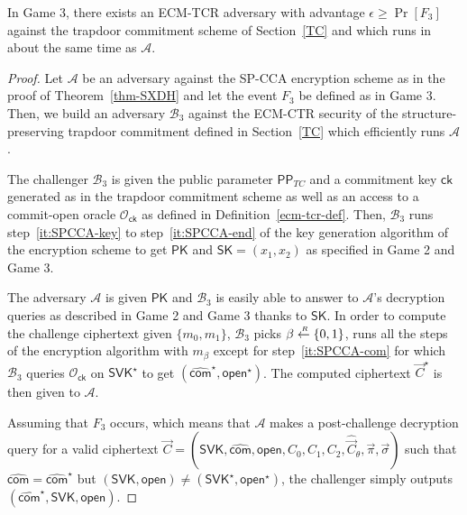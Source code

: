 \documentclass[10pt]{llncs}
\newcommand{\Adv}{\mathbf{Adv}}
\newcommand{\A}{\mathcal{A}}
\newcommand{\B}{\mathcal{B}}
\newcommand{\SK}{\mathsf{SK}}
\newcommand{\PK}{\mathsf{PK}}
\newcommand{\SVK}{\mathsf{SVK}}
\newcommand{\ck}{\mathsf{ck}}
\newcommand{\com}{\hat{\mathsf{com}}}
\newcommand{\open}{\mathsf{open}}
\newcommand{\sample}{\stackrel{{\scriptscriptstyle \mkern4mu R}}{\gets}}
\newcommand{\PPP}{\mathsf{PP}}
\begin{document}
\begin{lemma}\label{lemma-game3}
  In Game 3, %
	there exists an ECM-TCR adversary with  advantage $\epsilon \geq \Pr[F_3]$ against  the  trapdoor commitment scheme of Section~\ref{TC} and which 
	runs in about the same time as $\A$.
\end{lemma}
\begin{proof}
  Let $\A$ be an adversary against the SP-CCA encryption scheme as in the proof of
  Theorem~\ref{thm-SXDH} and let the event $F_3$ be defined as in Game 3. Then, we 
  build an adversary $\B_3$ against the ECM-CTR security of the 
  structure-preserving trapdoor commitment defined in Section~\ref{TC}
  which efficiently runs $\A$.
  
  The challenger $\B_3$ is given the public parameter $\PPP_{TC}$ and a 
  commitment key $\ck$ generated as in the trapdoor commitment scheme 
  as well as an access to a commit-open oracle $\mathcal{O}_{\ck}$ as
  defined in Definition~\ref{ecm-tcr-def}. 
  Then, $\B_3$ runs step~\ref{it:SPCCA-key} to step~\ref{it:SPCCA-end}
  of the key generation algorithm of the encryption scheme to get $\PK$
  and $\SK=(x_1,x_2)$ as specified in Game 2 and Game 3.
  
  The adversary $\A$ is given $\PK$ and $\B_3$ is easily able to answer to 
  $\A$'s decryption queries as described in Game 2 and Game 3 thanks to 
  $\SK$. In order to compute the challenge ciphertext given $\{m_0,m_1\}$, 
  $\B_3$ picks $\beta\sample\{0,1\}$, runs all the steps of the encryption
  algorithm with $m_\beta$ except for step~\ref{it:SPCCA-com} for which 
  $\B_3$ queries $\mathcal{O}_{\ck}$ on $\SVK^\star$ to get 
  $(\com^\star, \open^\star)$. The computed ciphertext $\vec{C}^\star$
  is then given to $\A$.
  
  Assuming that $F_3$ occurs, which means that $\A$ makes a post-challenge 
  decryption query for a valid ciphertext $ \vec{C} = (\SVK, \com, \open, 
  C_0, C_1, C_2, \hat{\vec{C}}_{\theta}, \vec{\pi}, \vec{\sigma})  $
  such that $\com=\com^\star$ but $(\SVK,\open) \neq (\SVK^\star,\open^\star)$,
  the challenger simply outputs $(\com^\star,\SVK,\open)$.
  

\end{proof}
\end{document}

